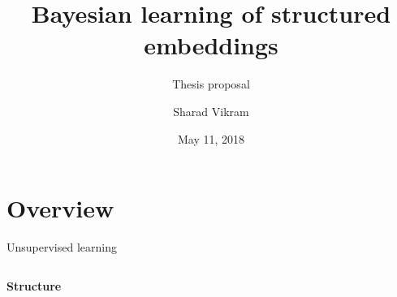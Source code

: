\documentclass[10pt, compress]{beamer}
\title{Bayesian learning of structured embeddings}
\subtitle{Thesis proposal}
\date{May 11, 2018}
\author{Sharad Vikram}
\institute{UCSD}
\begin{document}
\begin{frame}
  \titlepage
\end{frame}

\section{Overview}

\begin{frame}{Unsupervised learning}
  \begin{columns}[T]
    \begin{column}{0.5\textwidth}
      \begin{overlayarea}{\textwidth}{7cm}
        \begin{center}
          \Large \textbf{Structure}\\ \vspace{10pt}

\end{center}
\end{overlayarea}
\end{column}
\end{columns}
\end{frame}
\end{document}
